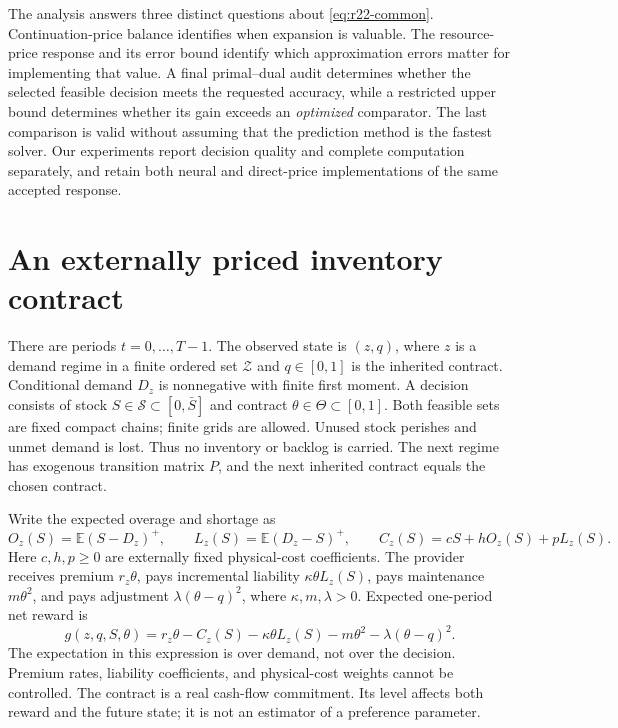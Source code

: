 \documentclass[11pt,letterpaper]{article}
\theoremstyle{definition}
\newcommand{\E}{\mathbb E}
\newcommand{\1}{\mathbf 1}
\newcommand{\pos}[1]{(#1)^+}
\begin{document}
The analysis answers three distinct questions about \eqref{eq:r22-common}. Continuation-price balance identifies when expansion is valuable. The resource-price response and its error bound identify which approximation errors matter for implementing that value. A final primal--dual audit determines whether the selected feasible decision meets the requested accuracy, while a restricted upper bound determines whether its gain exceeds an \emph{optimized} comparator. The last comparison is valid without assuming that the prediction method is the fastest solver. Our experiments report decision quality and complete computation separately, and retain both neural and direct-price implementations of the same accepted response.

\section{An externally priced inventory contract}\label{sec:model}
There are periods $t=0,\ldots,T-1$. The observed state is $(z,q)$, where $z$ is a demand regime in a finite ordered set $\mathcal Z$ and $q\in[0,1]$ is the inherited contract. Conditional demand $D_z$ is nonnegative with finite first moment. A decision consists of stock $S\in\mathcal S\subset[0,\bar S]$ and contract $\theta\in\Theta\subset[0,1]$. Both feasible sets are fixed compact chains; finite grids are allowed. Unused stock perishes and unmet demand is lost. Thus no inventory or backlog is carried. The next regime has exogenous transition matrix $P$, and the next inherited contract equals the chosen contract.

Write the expected overage and shortage as
\begin{equation}\label{eq:cost}
 O_z(S)=\E\pos{S-D_z},\qquad L_z(S)=\E\pos{D_z-S},\qquad
 C_z(S)=cS+hO_z(S)+pL_z(S).
\end{equation}
Here $c,h,p\geq0$ are externally fixed physical-cost coefficients. The provider receives premium $r_z\theta$, pays incremental liability $\kappa\theta L_z(S)$, pays maintenance $m\theta^2$, and pays adjustment $\lambda(\theta-q)^2$, where $\kappa,m,\lambda>0$. Expected one-period net reward is
\begin{equation}\label{eq:reward}
 g(z,q,S,\theta)=r_z\theta-C_z(S)-\kappa\theta L_z(S)
                       -m\theta^2-\lambda(\theta-q)^2.
\end{equation}
The expectation in this expression is over demand, not over the decision. Premium rates, liability coefficients, and physical-cost weights cannot be controlled. The contract is a real cash-flow commitment. Its level affects both reward and the future state; it is not an estimator of a preference parameter.
\end{document}
